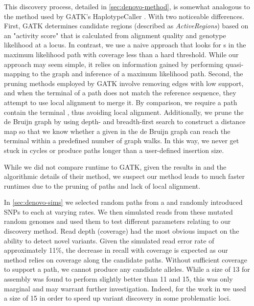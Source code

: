 This \denovo{} discovery process, detailed in \autoref{sec:denovo-method}, is somewhat analogous to the method used by GATK's HaplotypeCaller \cite{Poplin2018}. With two noticeable differences. First, GATK determines candidate regions (described as \emph{ActiveRegions}) based on an "activity score" that is calculated from alignment quality and genotype likelihood at a locus. In contrast, we use a naive approach that looks for \kmer{}s in the maximum likelihood path with coverage less than a hard threshold. While our approach may seem simple, it relies on information gained by performing quasi-mapping to the graph and inference of a maximum likelihood path. Second, the pruning methods employed by GATK involve removing edges with low support, and when the terminal \kmer{} of a path does not match the reference sequence, they attempt to use local alignment to merge it. By comparison, we require a path contain the terminal \kmer{}, thus avoiding local alignment. Additionally, we prune the de Bruijn graph by using depth- and breadth-first search to construct a distance map so that we know whether a given \kmer{} in the de Bruijn graph can reach the terminal \kmer{} within a predefined number of graph walks. In this way, we never get stuck in cycles or produce paths longer than a user-defined insertion size. 

While we did not compare \pandora{} runtime to GATK, given the results in \cite{Poplin2018} and the algorithmic details of their method, we suspect our method leads to much faster runtimes due to the pruning of paths and lack of local alignment.

\noindent
In \autoref{sec:denovo-sims} we selected random paths from a \panrg{} and randomly introduced SNPs to each at varying rates. We then simulated \ont{} reads from these mutated random genomes and used them to test different parameters relating to our \denovo{} discovery method. Read depth (coverage) had the most obvious impact on the ability to detect novel variants. Given the simulated \ont{} read error rate of approximately 11\%, the decrease in recall with coverage is expected as our method relies on \kmer{} coverage along the candidate paths. Without sufficient \kmer{} coverage to support a path, we cannot produce any candidate alleles. While a \kmer{} size of 13 for \denovo{} assembly was found to perform slightly better than 11 and 15, this was only marginal and may warrant further investigation. Indeed, for the work in \cite{pandora} we used a \denovo{} \kmer{} size of 15 in order to speed up variant discovery in some problematic loci.

